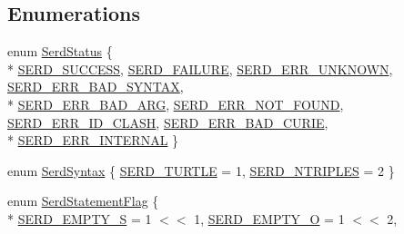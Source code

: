 \subsection*{Enumerations}
\begin{DoxyCompactItemize}
\item 
enum \hyperlink{group__serd_ga104d544e48b6282ef2447bb3ac7c330d}{Serd\+Status} \{ \\*
\hyperlink{group__serd_gga104d544e48b6282ef2447bb3ac7c330dafd38f5db6ffd5b5c8646c8023c95dd49}{S\+E\+R\+D\+\_\+\+S\+U\+C\+C\+E\+SS}, 
\hyperlink{group__serd_gga104d544e48b6282ef2447bb3ac7c330da826a381ebe3341da46e3557924de0340}{S\+E\+R\+D\+\_\+\+F\+A\+I\+L\+U\+RE}, 
\hyperlink{group__serd_gga104d544e48b6282ef2447bb3ac7c330dada1292115013f04e99b2ecfe32acd9a5}{S\+E\+R\+D\+\_\+\+E\+R\+R\+\_\+\+U\+N\+K\+N\+O\+WN}, 
\hyperlink{group__serd_gga104d544e48b6282ef2447bb3ac7c330da3f4b92675b7fb3fa8ee46611a0963a46}{S\+E\+R\+D\+\_\+\+E\+R\+R\+\_\+\+B\+A\+D\+\_\+\+S\+Y\+N\+T\+AX}, 
\\*
\hyperlink{group__serd_gga104d544e48b6282ef2447bb3ac7c330da138e7b6b98684e9f408bb91e49bbb315}{S\+E\+R\+D\+\_\+\+E\+R\+R\+\_\+\+B\+A\+D\+\_\+\+A\+RG}, 
\hyperlink{group__serd_gga104d544e48b6282ef2447bb3ac7c330daa92193f18699e3e21cce770c95eae842}{S\+E\+R\+D\+\_\+\+E\+R\+R\+\_\+\+N\+O\+T\+\_\+\+F\+O\+U\+ND}, 
\hyperlink{group__serd_gga104d544e48b6282ef2447bb3ac7c330da129e75e2f73cc16a2aeb9da549cdc3c8}{S\+E\+R\+D\+\_\+\+E\+R\+R\+\_\+\+I\+D\+\_\+\+C\+L\+A\+SH}, 
\hyperlink{group__serd_gga104d544e48b6282ef2447bb3ac7c330dab48fe996907c25db18ab33e6f97255b3}{S\+E\+R\+D\+\_\+\+E\+R\+R\+\_\+\+B\+A\+D\+\_\+\+C\+U\+R\+IE}, 
\\*
\hyperlink{group__serd_gga104d544e48b6282ef2447bb3ac7c330da80c3ada89b84f63901565856dd56389b}{S\+E\+R\+D\+\_\+\+E\+R\+R\+\_\+\+I\+N\+T\+E\+R\+N\+AL}
 \}
\item 
enum \hyperlink{group__serd_ga42683406fcfa9046b28dd951cefd3391}{Serd\+Syntax} \{ \hyperlink{group__serd_gga42683406fcfa9046b28dd951cefd3391a4acfee57d17213dcb55e94c55a4fd78e}{S\+E\+R\+D\+\_\+\+T\+U\+R\+T\+LE} = 1, 
\hyperlink{group__serd_gga42683406fcfa9046b28dd951cefd3391a3debf79a887908f0502c20029cd050a0}{S\+E\+R\+D\+\_\+\+N\+T\+R\+I\+P\+L\+ES} = 2
 \}
\item 
enum \hyperlink{group__serd_ga9f7ab02c389af900f04d29be09c57647}{Serd\+Statement\+Flag} \{ \\*
\hyperlink{group__serd_gga9f7ab02c389af900f04d29be09c57647a09c7af768d2df031e453af6cd4b5c443}{S\+E\+R\+D\+\_\+\+E\+M\+P\+T\+Y\+\_\+S} = 1 $<$$<$ 1, 
\hyperlink{group__serd_gga9f7ab02c389af900f04d29be09c57647a392894ad449f66514ac9395708bf7a2e}{S\+E\+R\+D\+\_\+\+E\+M\+P\+T\+Y\+\_\+O} = 1 $<$$<$ 2, 

\end{DoxyCompactItemize}

